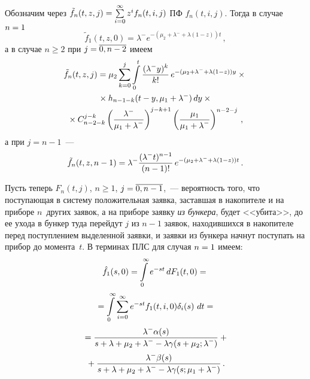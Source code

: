 \begin{multicols}{2}
Обозначим через
$\tilde f_n(t,z,j)\hm=\sum\limits_{i=0}^\infty z^i f_n(t,i,j)$
ПФ $f_n(t,i,j)$.
Тогда в случае $n\hm=1$
$$
\tilde f_1(t,z,0) = \lambda^-  e^{-(\mu_2 + \lambda^- +\lambda (1-z)) t}\,,
$$
а в случае $n \ge 2$ при $j\hm=\overline{0,n-2}$ имеем
\begin{multline*}
\tilde f_n(t,z,j) = \mu_2 \sum\limits_{k=0}^{j}
\int\limits_{0}^{t} \displaystyle\frac{\displaystyle (\lambda^- y)^k\mathstrut}{\displaystyle k! \mathstrut}\, e^{-(\mu_2+\lambda^- + \lambda (1-z)) y}\times{}\\
{}\times
h_{n-1-k}(t-y,\mu_1+\lambda^-)\,dy
\times{}
\\
{}\times
C_{n-2-k}^{j-k} \left(\displaystyle\frac{\displaystyle \lambda^- \mathstrut}{\displaystyle \mu_1 + \lambda^-\mathstrut}\right)^{j-k+1}
          \left(\displaystyle\frac{\displaystyle \mu_1 \mathstrut}{\displaystyle \mu_1 + \lambda^-\mathstrut}\right)^{n-2-j}\,,
\end{multline*}
а при $j=n-1$~---
$$
\tilde f_n(t,z,n-1) = \lambda^- \displaystyle\frac{\displaystyle (\lambda^- t)^{n-1}\mathstrut}{\displaystyle (n-1)!\mathstrut}\, e^{-(\mu_2+\lambda^- + \lambda (1-z)) t}\,.
$$

Пусть теперь $F_n(t,j)$, $n\ge 1$, $j\hm=\overline{0,n-1}$,~--- вероятность того, что поступающая в систему 
положительная заявка,
заставшая в накопителе и на приборе $n$~других заявок, а на приборе заявку
\textit{из бункера}, будет <<убита>>, до ее ухода в бункер туда перейдут $j$ из $n-1$ заявок,
находившихся в накопителе перед поступлением выделенной заявки, и
заявки из бункера начнут поступать на прибор до момента~$t$.
В терминах ПЛС для случая $n\hm=1$ имеем:
\begin{multline*}
\hat f_1(s,0) = \int\limits_{0}^\infty
e^{-st}\, dF_1(t,0) = {}\\[2pt]
{}=\int\limits_{0}^{\infty}
\sum\limits_{i=0}^{\infty} e^{-st}
f_1(t,i,0) \delta_i(s)\ dt ={}
\\[2pt]
{}=
\displaystyle\frac{\displaystyle \lambda^- \alpha (s) \mathstrut}{\displaystyle s+\lambda+\mu_2 + \lambda^- - \lambda \gamma(s+\mu_2;\lambda^-)\mathstrut}
+{}\\[2pt]
{}+
\displaystyle\frac{\displaystyle \lambda^-\beta (s)\mathstrut}{\displaystyle s+\lambda+\mu_2 + \lambda^- - \lambda \gamma(s; \mu_1+ \lambda^-)\mathstrut}\,.
\end{multline*}


\end{multicols}
